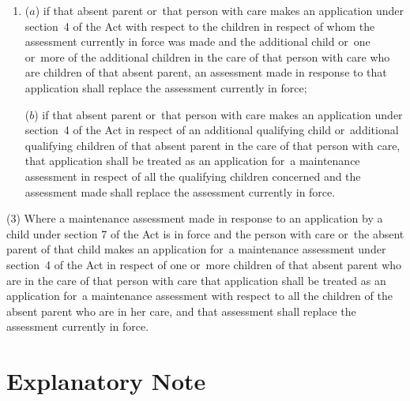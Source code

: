 \documentclass[a4paper,12pt]{article}
\begin{document}
\begin{enumerate}\item[]
($a$) if that absent parent or~that person with care makes an application under section~4 of the Act with respect to the children in respect of whom the assessment currently in force was made and the additional child or~one or~more of the additional children in the care of that person with care who are children of that absent parent, an assessment made in response to that application shall replace the assessment currently in force;

($b$) if that absent parent or~that person with care makes an application under section~4 of the Act in respect of an additional qualifying child or~additional qualifying children of that absent parent in the care of that person with care, that application shall be treated as an application for~a maintenance assessment in respect of all the qualifying children concerned and the assessment made shall replace the assessment currently in force.
\end{enumerate}

(3) Where a maintenance assessment made in response to an application by a child under section 7 of the Act is in force and the person with care 
or~the absent parent  %
of that child makes an application for~a maintenance assessment under section~4 of the Act in respect of 
one or~more 
  children of that absent parent who are in the care of that person with care  %
that application shall be treated as an application for~a maintenance assessment with respect to all the children of the absent parent who are in her care, and %
that assessment shall replace the assessment currently in force.%


\part{Explanatory Note}
\end{document}
